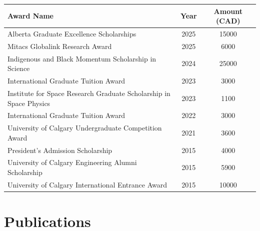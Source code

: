 \begin{table}[h!]
	\centering
	\renewcommand{\arraystretch}{1.3}
	\begin{tabularx}{\textwidth}{X c S[table-format=6,group-separator={,},group-minimum-digits=4]}
		\hline
		\textbf{Award Name}                                                & \textbf{Year} & \textbf{Amount (CAD)} \\
		\hline
		Alberta Graduate Excellence Scholarships                           & 2025          & 15000                 \\
		Mitacs Globalink Research Award                                    & 2025          & 6000                  \\
		Indigenous and Black Momentum Scholarship in Science               & 2024          & 25000                 \\
		International Graduate Tuition Award                               & 2023          & 3000                  \\
		Institute for Space Research Graduate Scholarship in Space Physics & 2023          & 1100                  \\
		International Graduate Tuition Award                               & 2022          & 3000                  \\
		University of Calgary Undergraduate Competition Award              & 2021          & 3600                  \\
		President's Admission Scholarship                                  & 2015          & 4000                  \\
		University of Calgary Engineering Alumni Scholarship               & 2015          & 5900                  \\
		University of Calgary International Entrance Award                 & 2015          & 10000                 \\
		\hline
	\end{tabularx}
\end{table}

\section{Publications}

\printbibliography[ heading=pubtype, type=thesis, title={\pubtitle{masterthesis}} ]

\printbibliography[ heading=pubtype, type=article, title={\pubtitle{article}} ]


\printbibliography[ heading=pubtype, type=report, title={\pubtitle{report}} ]

